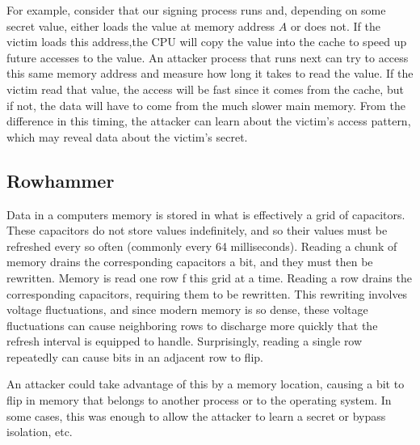 For example, consider that our signing process runs and, depending on some secret value, either loads the value at memory address $A$ or does not. If the victim loads this address,the CPU will copy the value into the cache to speed up future accesses to the value. An attacker process that runs next can try to access this same memory address and measure how long it takes to read the value. If the victim read that value, the access will be fast since it comes from the cache, but if not, the data will have to come from the much slower main memory. From the difference in this timing, the attacker can learn about the victim's access pattern, which may reveal data about the victim's secret. 

\subsection{Rowhammer}
Data in a computers memory is stored in what is effectively a grid of capacitors. These capacitors do not store values indefinitely, and so their values must be refreshed every so often (commonly every 64 milliseconds). Reading a chunk of memory drains the corresponding capacitors a bit, and they must then be rewritten. Memory is read one row f this grid at a time. Reading a row drains the corresponding capacitors, requiring them to be rewritten. This rewriting involves voltage fluctuations, and since modern memory is so dense, these voltage fluctuations can cause neighboring rows to discharge more quickly that the refresh interval is equipped to handle. Surprisingly, reading a single row repeatedly can cause bits in an adjacent row to flip.

An attacker could take advantage of this by  a memory location, causing a bit to flip in memory that belongs to another process or to the operating system. In some cases, this was enough to allow the attacker to learn a secret or bypass isolation, etc.

